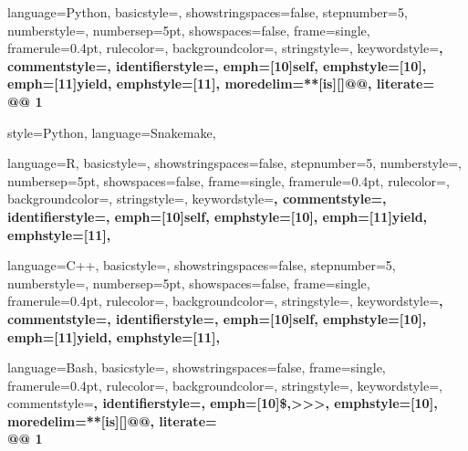 
{
  language=Python,
  basicstyle=\small,
  showstringspaces=false,
  stepnumber=5,
  numberstyle=\tiny,
  numbersep=5pt,
  showspaces=false,
  frame=single,
  framerule=0.4pt,
  rulecolor=\color{pgrey},
  backgroundcolor=\color{white},
  stringstyle=\color{BrickRed},
  keywordstyle=\color{BlueViolet}\bfseries,
  commentstyle=\color{PineGreen}\bfseries,
  identifierstyle={},
  emph={[10]self}, emphstyle={[10]\color{pblue}},
  emph={[11]yield}, emphstyle={[11]\color{pblue}},
  moredelim=**[is][\bfseries\color{red}]{@}{@},
  literate={\\@}{{\makeatletter @ \makeatother}}1
}

{
  style=Python,
  language=Snakemake,
}

{
  language=R,
  basicstyle=\small,
  showstringspaces=false,
  stepnumber=5,
  numberstyle=\tiny,
  numbersep=5pt,
  showspaces=false,
  frame=single,
  framerule=0.4pt,
  rulecolor=\color{pgrey},
  backgroundcolor=\color{white},
  stringstyle=\color{BrickRed},
  keywordstyle=\color{BlueViolet}\bfseries,
  commentstyle=\color{PineGreen}\bfseries,
  identifierstyle={},
  emph={[10]self}, emphstyle={[10]\color{pblue}},
  emph={[11]yield}, emphstyle={[11]\color{pblue}},
}

{
  language=C++,
  basicstyle=\small,
  showstringspaces=false,
  stepnumber=5,
  numberstyle=\tiny,
  numbersep=5pt,
  showspaces=false,
  frame=single,
  framerule=0.4pt,
  rulecolor=\color{pgrey},
  backgroundcolor=\color{white},
  stringstyle=\color{BrickRed},
  keywordstyle=\color{BlueViolet}\bfseries,
  commentstyle=\color{PineGreen}\bfseries,
  identifierstyle={},
  emph={[10]self}, emphstyle={[10]\color{pblue}},
  emph={[11]yield}, emphstyle={[11]\color{pblue}},
}

\newcommand{\CC}{C\nolinebreak\hspace{-.05em}\raisebox{1ex}{\tiny\bf +}\nolinebreak\hspace{-.10em}\raisebox{1ex}{\tiny\bf +}}

{
  language=Bash,
  basicstyle=\ttfamily\small,
  showstringspaces=false,
  frame=single,
  framerule=0.4pt,
  rulecolor=\color{pgrey},
  backgroundcolor=\color{plightgrey2},
  stringstyle=\color{BrickRed},
  keywordstyle=\color{BlueViolet},
  commentstyle=\color{PineGreen}\bfseries,
  identifierstyle=\color{black},
  emph={[10]\$,>>>}, emphstyle={[10]\color{pblue}},
  moredelim=**[is][\bfseries\color{red}]{@}{@},
  literate={\\@}{{\makeatletter @ \makeatother}}1
}

